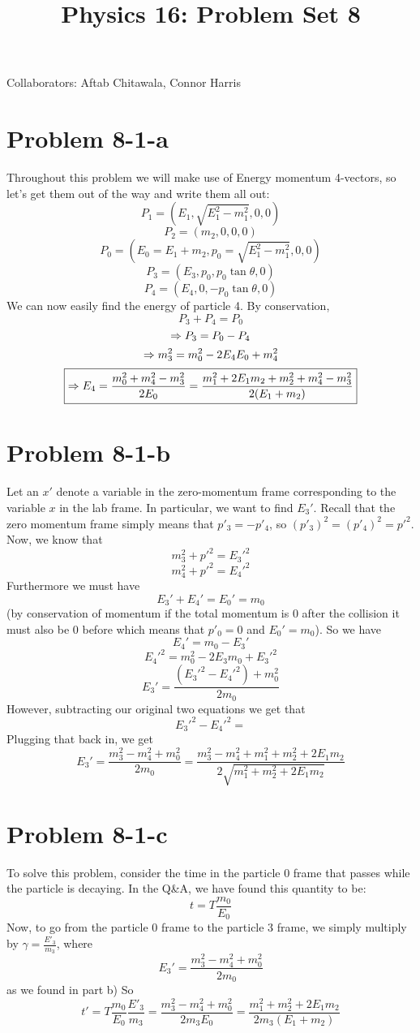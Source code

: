 \title{Physics 16: Problem Set 8}

\maketitle
\begin{center}
Collaborators: Aftab Chitawala, Connor Harris
\end{center}
\section*{Problem 8-1-a}
Throughout this problem we will make use of Energy momentum 4-vectors, so let's get them out of the way and write them all out:
\[ P_1 = (E_1,\sqrt{E_1^2-m_1^2},0,0) \]
\[ P_2 = (m_2,0,0,0) \]
\[ P_0 = (E_0=E_1+m_2,p_0=\sqrt{E_1^2-m_1^2},0,0) \]
\[ P_3 = (E_3,p_0,p_0\tan \theta,0) \]
\[ P_4 = (E_4,0,-p_0\tan\theta,0) \]
We can now easily find the energy of particle 4. By conservation,
\[ P_3+P_4 = P_0 \]
\[ \Rightarrow P_3=P_0-P_4 \]
\[ \Rightarrow m_3^2 = m_0^2 - 2E_4E_0 +m_4^2 \]
\[ \boxed{\Rightarrow  E_4 = \frac{m_0^2+m_4^2-m_3^2}{2E_0} =  \frac{m_1^2 + 2E_1m_2 + m_2^2 + m_4^2 - m_3^2}{2(E_1+m_2)}} \]
\section*{Problem 8-1-b}
Let an $x'$ denote a variable in the zero-momentum frame corresponding to the variable $x$ in the lab frame. In particular, we want to find $E_3'$. Recall that the zero momentum frame simply means that $p'_3=-p'_4$, so $(p'_3)^2=(p'_4)^2=p'^2$. Now, we know that
\[ m_3^2 + p'^2 = E_3'^2 \]
\[ m_4^2 + p'^2 = E_4'^2 \]
Furthermore we must have
\[ E_3' + E_4' = E_0' = m_0 \]
(by conservation of momentum if the total momentum is $0$ after the collision it must also be $0$ before which means that $p'_0=0$ and $E_0' = m_0$).
So we have 
\[ E_4' = m_0 - E_3' \]
\[ E_4'^2 = m_0^2 - 2E_3m_0 + E_3'^2 \]
\[ E_3' = \frac{(E_3'^2-E_4'^2) + m_0^2}{2m_0} \]
However, subtracting our  original two equations we get that
\[ E_3'^2-E_4'^2 = \]
Plugging that back in, we get
\[ \boxed{ E_3' = \frac{m_3^2-m_4^2+m_0^2}{2m_0} = \frac{m_3^2 - m_4^2 + m_1^2+m_2^2+2E_1m_2}{2\sqrt{m_1^2+m_2^2+2E_1m_2}}} \]
\section*{Problem 8-1-c}
To solve this problem, consider the time in the particle 0 frame that passes while the particle is decaying. In the Q\&A, we have found this quantity to be:
\[ t = T\frac{m_0}{E_0} \]
Now, to go from the particle 0 frame to the particle 3 frame, we simply multiply by $\gamma=\frac{E'_3}{m_3}$, where 
\[ E_3' = \frac{m_3^2-m_4^2+m_0^2}{2m_0} \]
as we found in part b)
So
\[ \boxed{ t' = T\frac{m_0}{E_0}\frac{E'_3}{m_3} = \frac{m_3^2-m_4^2+m_0^2}{2m_3E_0} = \frac{m_1^2+m_2^2+2E_1m_2}{2m_3(E_1+m_2)} }\]
